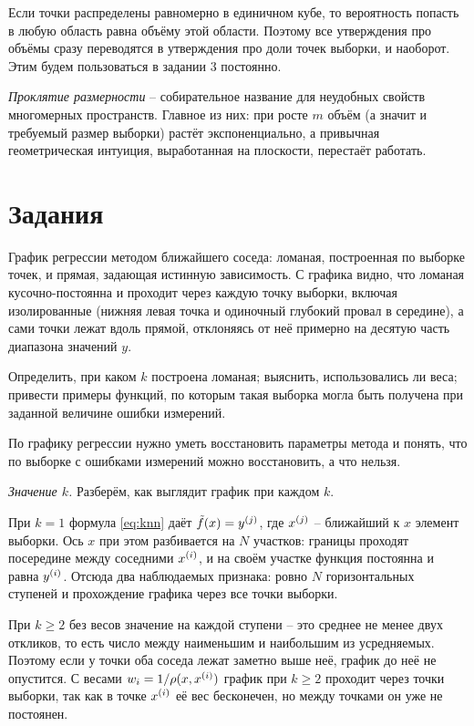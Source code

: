 \documentclass[12pt,a4paper]{article}
\begin{document}
Если точки распределены равномерно в единичном кубе, то вероятность попасть в
любую область равна объёму этой области. Поэтому все утверждения про объёмы
сразу переводятся в утверждения про доли точек выборки, и наоборот. Этим будем
пользоваться в задании 3 постоянно.

\emph{Проклятие размерности} -- собирательное название для неудобных свойств
многомерных пространств. Главное из них: при росте $m$ объём (а значит и
требуемый размер выборки) растёт экспоненциально, а привычная геометрическая
интуиция, выработанная на плоскости, перестаёт работать.

\section{Задания}

\dano График регрессии методом ближайшего соседа: ломаная, построенная по
выборке точек, и прямая, задающая истинную зависимость. С графика видно, что
ломаная кусочно-постоянна и проходит через каждую точку выборки, включая
изолированные (нижняя левая точка и одиночный глубокий провал в середине), а
сами точки лежат вдоль прямой, отклоняясь от неё примерно на десятую часть
диапазона значений $y$.

\treb Определить, при каком $k$ построена ломаная; выяснить, использовались ли
веса; привести примеры функций, по которым такая выборка могла быть получена при
заданной величине ошибки измерений.

\zachem По графику регрессии нужно уметь восстановить параметры метода и понять,
что по выборке с ошибками измерений можно восстановить, а что нельзя.

\resh

\emph{Значение $k$.} Разберём, как выглядит график при каждом $k$.

При $k = 1$ формула \eqref{eq:knn} даёт $\tilde{f}(x) = y^{(j)}$, где $x^{(j)}$ --
ближайший к $x$ элемент выборки. Ось $x$ при этом разбивается на $N$ участков:
границы проходят посередине между соседними $x^{(i)}$, и на своём участке функция
постоянна и равна $y^{(i)}$. Отсюда два наблюдаемых признака: ровно $N$
горизонтальных ступеней и прохождение графика через все точки выборки.

При $k \ge 2$ без весов значение на каждой ступени -- это среднее не менее двух
откликов, то есть число между наименьшим и наибольшим из усредняемых. Поэтому
если у точки оба соседа лежат заметно выше неё, график до неё не опустится. С
весами $w_i = 1/\rho(x, x^{(i)})$ график при $k \ge 2$ проходит через точки
выборки, так как в точке $x^{(i)}$ её вес бесконечен, но между точками он уже не
постоянен.
\end{document}
